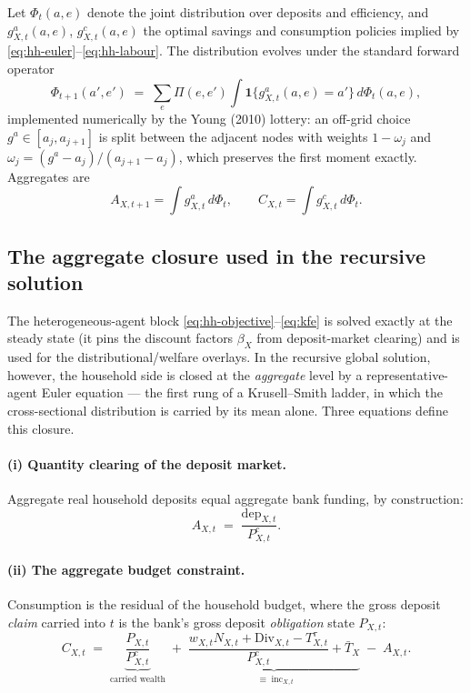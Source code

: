\documentclass[11pt]{article}
\numberwithin{equation}{section}
\newcommand{\one}{\mathbf{1}}
\theoremstyle{definition}
\theoremstyle{plain}
\theoremstyle{remark}
\begin{document}
Let $\Phi_t(a,e)$ denote the joint distribution over deposits and efficiency, and
$g^{a}_{X,t}(a,e)$, $g^{c}_{X,t}(a,e)$ the optimal savings and consumption policies
implied by \eqref{eq:hh-euler}--\eqref{eq:hh-labour}. The distribution evolves under
the standard forward operator
\begin{equation}
\Phi_{t+1}(a',e')\;=\;\sum_{e}\Pi(e,e')\int
   \one\bigl\{g^{a}_{X,t}(a,e)=a'\bigr\}\,d\Phi_t(a,e),
\label{eq:kfe}
\end{equation}
implemented numerically by the Young (2010) lottery: an off-grid choice
$g^{a}\in[a_j,a_{j+1}]$ is split between the adjacent nodes with weights
$1-\omega_j$ and $\omega_j=(g^{a}-a_j)/(a_{j+1}-a_j)$, which preserves the first
moment exactly. Aggregates are
\begin{equation}
A_{X,t+1}=\int g^{a}_{X,t}\,d\Phi_t,
\qquad
C_{X,t}=\int g^{c}_{X,t}\,d\Phi_t .
\label{eq:hh-aggregates}
\end{equation}

\subsection{The aggregate closure used in the recursive solution}
\label{sec:hh-closure}

The heterogeneous-agent block \eqref{eq:hh-objective}--\eqref{eq:kfe} is solved
exactly at the steady state (it pins the discount factors $\beta_X$ from
deposit-market clearing) and is used for the distributional/welfare overlays. In the
recursive global solution, however, the household side is closed at the
\emph{aggregate} level by a representative-agent Euler equation --- the first rung of
a Krusell--Smith ladder, in which the cross-sectional distribution is carried by its
mean alone. Three equations define this closure.

\paragraph{(i) Quantity clearing of the deposit market.} Aggregate real household
deposits equal aggregate bank funding, by construction:
\begin{equation}
A_{X,t}\;=\;\frac{\mathrm{dep}_{X,t}}{P^{c}_{X,t}} .
\label{eq:dep-quantity}
\end{equation}

\paragraph{(ii) The aggregate budget constraint.} Consumption is the residual of the
household budget, where the gross deposit \emph{claim} carried into $t$ is the bank's
gross deposit \emph{obligation} state $P_{X,t}$:
\begin{equation}
C_{X,t}
\;=\;\underbrace{\frac{P_{X,t}}{P^{c}_{X,t}}}_{\text{carried wealth}}
\;+\;\underbrace{\frac{w_{X,t}N_{X,t}+\mathrm{Div}_{X,t}-T^{\tau}_{X,t}}{P^{c}_{X,t}}
     +\bar{T}_X}_{\;\equiv\;\text{inc}_{X,t}}
\;-\;A_{X,t}.
\label{eq:hh-budget-agg}
\end{equation}
\end{document}
